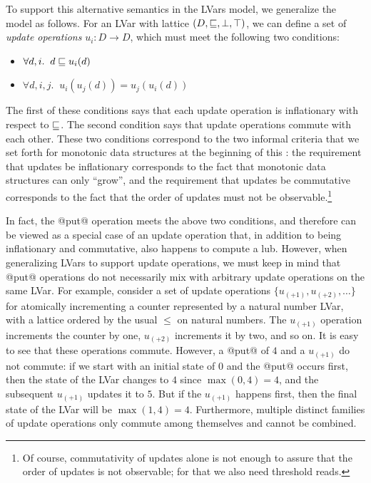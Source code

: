 To support this alternative semantics in the LVars model, we
generalize the model as follows.  For an LVar with lattice $(D,
\sqsubseteq, \bot, \top)$, we can define a set of \emph{update
  operations} $u_i : D \rightarrow D$, which must meet the following
two conditions:
\begin{itemize}
\item $\forall d, i.     \;\; d \sqsubseteq u_i(d) $
\item $\forall d, i, j.  \;\; u_i(u_j(d)) = u_j(u_i(d)) $
\end{itemize}
The first of these conditions says that each update operation is
inflationary with respect to $\sqsubseteq$.  The second condition says
that update operations commute with each other.  These two conditions
correspond to the two informal criteria that we set forth for
monotonic data structures at the beginning of this : the
requirement that updates be inflationary corresponds to the fact that
monotonic data structures can only ``grow'', and the requirement that
updates be commutative corresponds to the fact that the order of
updates must not be observable.\footnote{Of course, commutativity of
  updates alone is not enough to assure that the order of updates is
  not observable; for that we also need threshold reads.}


In fact, the @put@ operation meets the above two conditions, and
therefore can be viewed as a special case of an update operation that,
in addition to being inflationary and commutative, also happens to
compute a lub.  However, when generalizing LVars to support update
operations, we must keep in mind that @put@ operations do not
necessarily mix with arbitrary update operations on the same LVar.
For example, consider a set of update operations $\{ u_{(+1)},
u_{(+2)}, \dots \}$ for atomically incrementing a counter represented
by a natural number LVar, with a lattice ordered by the usual $\leq$
on natural numbers.  The $u_{(+1)}$ operation increments the counter
by one, $u_{(+2)}$ increments it by two, and so on.  It is easy to see
that these operations commute.  However, a @put@ of $4$ and a
$u_{(+1)}$ do not commute: if we start with an initial state of $0$
and the @put@ occurs first, then the state of the LVar changes to $4$
since $\max(0, 4) = 4$, and the subsequent $u_{(+1)}$ updates it to
$5$.  But if the $u_{(+1)}$ happens first, then the final state of the
LVar will be $\max(1, 4) = 4$.  Furthermore, multiple distinct
families of update operations only commute among themselves and cannot
be combined.

